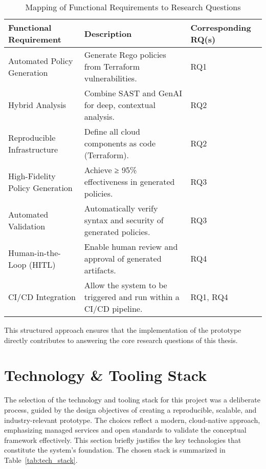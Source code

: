 \begin{table}[h!]
\centering
\begin{tabular}{|l|p{6cm}|l|}
\hline
\textbf{Functional Requirement} & \textbf{Description} & \textbf{Corresponding RQ(s)} \\
\hline
Automated Policy Generation & Generate Rego policies from Terraform vulnerabilities. & RQ1 \\
\hline
Hybrid Analysis & Combine SAST and GenAI for deep, contextual analysis. & RQ2 \\
\hline
Reproducible Infrastructure & Define all cloud components as code (Terraform). & RQ2 \\
\hline
High-Fidelity Policy Generation & Achieve ≥ 95\% effectiveness in generated policies. & RQ3 \\
\hline
Automated Validation & Automatically verify syntax and security of generated policies. & RQ3 \\
\hline
Human-in-the-Loop (HITL) & Enable human review and approval of generated artifacts. & RQ4 \\
\hline
CI/CD Integration & Allow the system to be triggered and run within a CI/CD pipeline. & RQ1, RQ4 \\
\hline
\end{tabular}
\caption{Mapping of Functional Requirements to Research Questions}
\label{tab:req_rq_mapping}
\end{table}

This structured approach ensures that the implementation of the prototype directly contributes to answering the core research questions of this thesis.

\section{Technology & Tooling Stack}

The selection of the technology and tooling stack for this project was a deliberate process, guided by the design objectives of creating a reproducible, scalable, and industry-relevant prototype. The choices reflect a modern, cloud-native approach, emphasizing managed services and open standards to validate the conceptual framework effectively. This section briefly justifies the key technologies that constitute the system's foundation. The chosen stack is summarized in Table~\ref{tab:tech_stack}.

